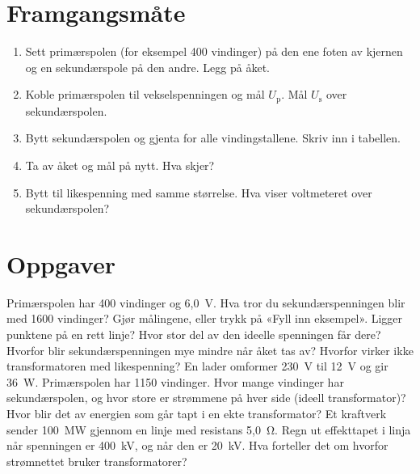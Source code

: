 \documentclass[11pt]{article}
\begin{document}
\section*{Framgangsmåte}

\begin{enumerate}
\item Sett primærspolen (for eksempel 400 vindinger) på den ene foten av kjernen og en sekundærspole på den andre. Legg på åket.
\item Koble primærspolen til vekselspenningen og mål $U_{\mathrm{p}}$. Mål $U_{\mathrm{s}}$ over sekundærspolen.
\item Bytt sekundærspolen og gjenta for alle vindingstallene. Skriv inn i tabellen.
\item Ta av åket og mål på nytt. Hva skjer?
\item Bytt til likespenning med samme størrelse. Hva viser voltmeteret over sekundærspolen?
\end{enumerate}

\section*{Oppgaver}

\begin{oppgaveliste}
\oppgave {}Primærspolen har 400 vindinger og 6,0~V. Hva tror du sekundærspenningen blir med 1600 vindinger?
\svar
\oppgave {}Gjør målingene, eller trykk på «Fyll inn eksempel». Ligger punktene på en rett linje? Hvor stor del av den ideelle spenningen får dere?
\svar
\oppgave {}Hvorfor blir sekundærspenningen mye mindre når åket tas av? Hvorfor virker ikke transformatoren med likespenning?
\svar
\oppgave {}En lader omformer 230~V til 12~V og gir 36~W. Primærspolen har 1150 vindinger. Hvor mange vindinger har sekundærspolen, og hvor store er strømmene på hver side (ideell transformator)?
\svar
\oppgave {}Hvor blir det av energien som går tapt i en ekte transformator?
\svar
\oppgave {}Et kraftverk sender 100~MW gjennom en linje med resistans 5,0~Ω. Regn ut effekttapet i linja når spenningen er 400~kV, og når den er 20~kV. Hva forteller det om hvorfor strømnettet bruker transformatorer?
\svar
\end{oppgaveliste}
\end{document}
